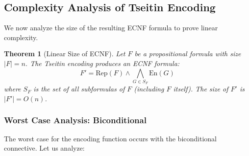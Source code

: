 \documentclass[11pt,a4paper]{article}
\theoremstyle{definition}
\theoremstyle{plain}
\newtheorem{theorem}{Theorem}[section]
\theoremstyle{remark}
\begin{document}
\subsection{Complexity Analysis of Tseitin Encoding}

We now analyze the size of the resulting ECNF formula to prove linear complexity.

\begin{tcolorbox}[colback=purple!5!white,colframe=purple!75!black,title=\textbf{Linear Size of ECNF}]
\begin{theorem}[Linear Size of ECNF]
Let $F$ be a propositional formula with size $|F| = n$. The Tseitin encoding produces an ECNF formula:
\[
F' = \text{Rep}(F) \land \bigwedge_{G \in S_F} \text{En}(G)
\]
where $S_F$ is the set of all subformulas of $F$ (including $F$ itself). The size of $F'$ is $|F'| = O(n)$.
\end{theorem}
\end{tcolorbox}

\subsubsection{Worst Case Analysis: Biconditional}

The worst case for the encoding function occurs with the biconditional connective. Let us analyze:
\end{document}
